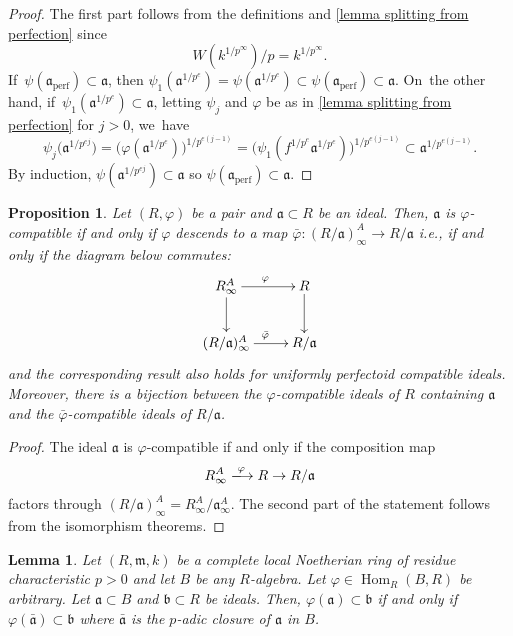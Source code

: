 \documentclass[11pt]{article}
\newcommand{\ie}{i.e.,\xspace}
\let\autoref\cref
\theoremstyle{plain}
\newtheorem{proposition}[theorem]{Proposition}
\newtheorem{lemma}[theorem]{Lemma}
\theoremstyle{definition}
\numberwithin{equation}{theorem}
\newcommand{\fra}{\mathfrak{a}}
\newcommand{\frab}{\mathfrak{b}}
\newcommand{\fram}{\mathfrak{m}}
\DeclareMathOperator{\Hom}{Hom}
\newcommand{\perf}{_{\mathrm{perf}}}
\newcommand{\unpe}{{1/{p^e}}}
\renewcommand{\phi}{\varphi}
\newcommand{\rphi}{(R,\phi)}
\newcommand{\unpfty}{{1/p^\infty}}
\newcommand{\rafty}{R^A_\infty}
\newcommand{\aafty}{\fra^A_\infty}
\begin{document}
\begin{proof}
The first part follows from the definitions and \autoref{lemma splitting from perfection} since
\[
W(k^\unpfty)/p=k^\unpfty.
\]
If~$\psi(\fra\perf)\subset\fra$, then $\psi_1(\fra^\unpe)=\psi(\fra^\unpe)\subset\psi(\fra\perf) \subset \fra$. On~the other hand, if~$\psi_1(\fra^\unpe)\subset \fra$,
letting $\psi_j$ and $\phi$ be as in \autoref{lemma splitting from perfection} for $j>0$, we~have
\[
\psi_j\bigl(\fra^{1/p^{ej}}\bigl)=\bigl(\phi(\fra^{1/p^{e}})\bigr)^{1/p^{e(j-1)}}=\bigl(\psi_1(f^\unpe\fra^\unpe) \bigr)^{1/p^{e(j-1)}}\subset \fra^{1/p^{e(j-1)}}.
\]
By induction, $\psi(\fra^{1/p^{ej}})\subset \fra$ so $\psi(\fra\perf)\subset \fra$.
\end{proof}

\begin{proposition}\label{compatible equivalent to comm diag quotient}
Let $\rphi$ be a pair and $\fra\subset R$ be an ideal. Then, $\fra$ is $\phi$\nobreakdash-compatible if and only if $\phi$ descends to a map $\bar{\phi}\colon(R/\fra)^A_\infty\to R/\fra$ \ie if and only if the diagram below commutes:\vspace*{-5pt}
\begin{equation}\label{comm diag quotient comp ideal}
\begin{array}{c}
\xymatrix{
\rafty \ar[d] \ar[r]^\phi & R \ar[d]\\
(R/\fra)^A_\infty\ar[r]^{\bar{\phi}}& R/\fra
}
\end{array}
\end{equation}
and the corresponding result also holds for uniformly perfectoid compatible ideals.
Moreover, there is a bijection between the $\phi$-compatible ideals of $R$ containing $\fra$ and the $\bar{\phi}$-compatible ideals of $R/\fra$.
\end{proposition}

\begin{proof}
The ideal $\fra$ is $\phi$-compatible if and only if the composition map
\[\rafty\xlongrightarrow{\phi} R\to R/\fra
\]factors through $(R/\fra)_\infty^A=\rafty/\aafty$. The second part of the statement follows from the isomorphism theorems.
\end{proof}

\begin{lemma}\label{p adic closure of comp ideal}
Let $(R,\fram, k)$ be a complete local Noetherian ring of residue characteristic $p>0$ and let $B$ be any $R$\nobreakdash-algebra. Let $\phi\in \Hom_R(B,R)$ be arbitrary. Let $\fra\subset B$ and $\frab\subset R$ be ideals. Then, $\phi(\fra)\subset \frab$ if and only if $\phi(\bar{\fra})\subset \frab$ where $\bar{\fra}$ is the $p$-adic closure of $\fra$ in $B$.
\end{lemma}
\end{document}
